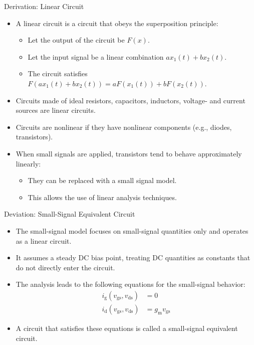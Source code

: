 \begin{frame}{Derivation: Linear Circuit}
    \begin{itemize}
        \item A linear circuit is a circuit that obeys the superposition principle:
        \begin{itemize}
            \item Let the output of the circuit be $F(x)$.
            \item Let the input signal be a linear combination $a x_{1}(t)+b x_{2}(t)$.
            \item The circuit satisfies $F(a x_{1}(t) + b x_{2}(t)) = a F(x_{1}(t)) + b F(x_{2}(t))$.
        \end{itemize}
        \item Circuits made of ideal resistors, capacitors, inductors, voltage- and current sources are linear circuits.
        \item Circuits are nonlinear if they have nonlinear components (e.g., diodes, transistors).
        \item When small signals are applied, transistors tend to behave approximately linearly:
        \begin{itemize}
            \item They can be replaced with a small signal model.
            \item This allows the use of linear analysis techniques.
        \end{itemize}
    \end{itemize}
\end{frame}

\begin{frame}{Deviation: Small-Signal Equivalent Circuit}
    \begin{itemize}
        \item The small-signal model focuses on small-signal quantities only and operates as a 
        linear circuit.
        \item It assumes a steady DC bias point, treating DC quantities as constants that do not 
        directly enter the circuit.
        \item The analysis leads to the following equations for the small-signal behavior:
        \begin{align*}
            i_{\mathrm{g}}(v_{\mathrm{gs}}, v_{\mathrm{ds}}) &= 0 \\
            i_{\mathrm{d}}(v_{\mathrm{gs}}, v_{\mathrm{ds}}) &= g_{\mathrm{m}}v_{\mathrm{gs}}
        \end{align*}
        \item A circuit that satisfies these equations is called a small-signal equivalent circuit.
    \end{itemize}
\end{frame}

